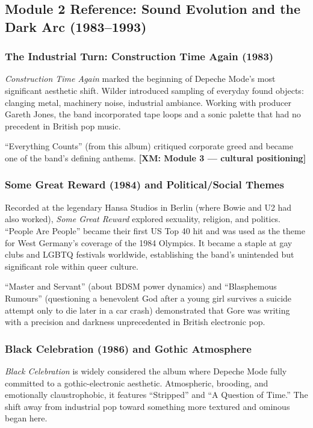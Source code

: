 \documentclass[11pt,letterpaper]{article}
\begin{document}
\subsection{Module 2 Reference: Sound Evolution and the Dark Arc (1983--1993)}

\subsubsection{The Industrial Turn: Construction Time Again (1983)}

\textit{Construction Time Again} marked the beginning of Depeche Mode's most significant aesthetic shift. Wilder introduced sampling of everyday found objects: clanging metal, machinery noise, industrial ambiance. Working with producer Gareth Jones, the band incorporated tape loops and a sonic palette that had no precedent in British pop music.

``Everything Counts'' (from this album) critiqued corporate greed and became one of the band's defining anthems. \textbf{[XM: Module 3 — cultural positioning]}

\subsubsection{Some Great Reward (1984) and Political/Social Themes}

Recorded at the legendary Hansa Studios in Berlin (where Bowie and U2 had also worked), \textit{Some Great Reward} explored sexuality, religion, and politics. ``People Are People'' became their first US Top 40 hit and was used as the theme for West Germany's coverage of the 1984 Olympics. It became a staple at gay clubs and LGBTQ festivals worldwide, establishing the band's unintended but significant role within queer culture.

``Master and Servant'' (about BDSM power dynamics) and ``Blasphemous Rumours'' (questioning a benevolent God after a young girl survives a suicide attempt only to die later in a car crash) demonstrated that Gore was writing with a precision and darkness unprecedented in British electronic pop.

\subsubsection{Black Celebration (1986) and Gothic Atmosphere}

\textit{Black Celebration} is widely considered the album where Depeche Mode fully committed to a gothic-electronic aesthetic. Atmospheric, brooding, and emotionally claustrophobic, it features ``Stripped'' and ``A Question of Time.'' The shift away from industrial pop toward something more textured and ominous began here.
\end{document}
